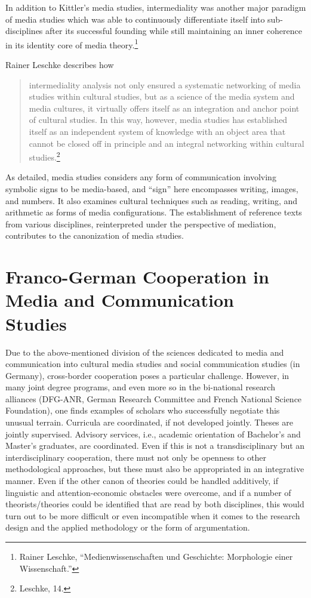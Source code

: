 \documentclass{tufte-handout}
\begin{document}
In addition to Kittler's media studies, intermediality was another major
paradigm of media studies which was able to continuously differentiate
itself into sub-disciplines after its successful founding while still
maintaining an inner coherence in its identity core of media
theory.\footnote{Rainer Leschke, ``Medienwissenschaften und Geschichte:
  Morphologie einer Wissenschaft.''}

Rainer Leschke describes how

\begin{quote}
intermediality analysis not only ensured a systematic networking of
media studies within cultural studies, but as a science of the media
system and media cultures, it virtually offers itself as an integration
and anchor point of cultural studies. In this way, however, media
studies has established itself as an independent system of knowledge
with an object area that cannot be closed off in principle and an
integral networking within cultural studies.\footnote{Leschke, 14.}
\end{quote}

\noindent As detailed, media studies considers any form of communication involving
symbolic signs to be media-based, and ``sign'' here encompasses writing,
images, and numbers. It also examines cultural techniques such as
reading, writing, and arithmetic as forms of media configurations. The
establishment of reference texts from various disciplines, reinterpreted
under the perspective of mediation, contributes to the canonization of
media studies.

\newpage\hypertarget{franco-german-cooperation-in-media-and-communication-studies}{%
\section{Franco-German Cooperation in Media and Communication\\\noindent
Studies}\label{franco-german-cooperation-in-media-and-communication-studies}}

Due to the above-mentioned division of the sciences dedicated to media
and communication into cultural media studies and social communication
studies (in Germany), cross-border cooperation poses a particular
challenge. However, in many joint degree programs, and even more so in
the bi-national research alliances (DFG-ANR, German Research Committee
and French National Science Foundation), one finds examples of scholars
who successfully negotiate this unusual terrain. Curricula are
coordinated, if not developed jointly. Theses are jointly supervised.
Advisory services, i.e., academic orientation of Bachelor's and Master's
graduates, are coordinated. Even if this is not a transdisciplinary but
an interdisciplinary cooperation, there must not only be openness to
other methodological approaches, but these must also be appropriated in
an integrative manner. Even if the other canon of theories could be
handled additively, if linguistic and attention-economic obstacles were
overcome, and if a number of theorists/theories could be identified that
are read by both disciplines, this would turn out to be more difficult
or even incompatible when it comes to the research design and the
applied methodology or the form of argumentation.
\end{document}
